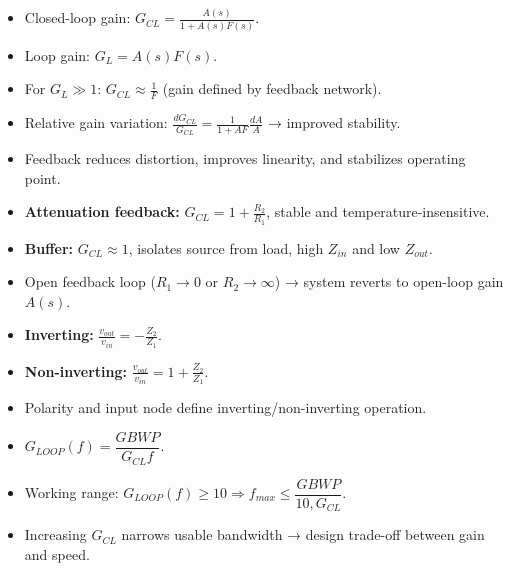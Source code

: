 \begin{tcolorbox}[colback=gray!10,colframe=black,title=Summary: Negative Feedback Principles]
\begin{itemize}
\item Closed-loop gain: $\displaystyle G_{CL} = \frac{A(s)}{1 + A(s)F(s)}$.
\item Loop gain: $G_L = A(s)F(s)$.
\item For $G_L \gg 1$: $G_{CL} \approx \frac{1}{F}$ (gain defined by feedback network).
\item Relative gain variation: $\displaystyle \frac{dG_{CL}}{G_{CL}} = \frac{1}{1+AF}\frac{dA}{A}$ → improved stability.
\item Feedback reduces distortion, improves linearity, and stabilizes operating point.
\end{itemize}
\end{tcolorbox}

\begin{tcolorbox}[colback=gray!10,colframe=black,title=Summary: Feedback Implementations & Buffers]
\begin{itemize}
\item \textbf{Attenuation feedback:} $\displaystyle G_{CL} = 1 + \frac{R_2}{R_1}$, stable and temperature-insensitive.
\item \textbf{Buffer:} $G_{CL} \approx 1$, isolates source from load, high $Z_{in}$ and low $Z_{out}$.
\item Open feedback loop ($R_1 \to 0$ or $R_2 \to \infty$) → system reverts to open-loop gain $A(s)$.
\end{itemize}
\end{tcolorbox}

\begin{tcolorbox}[colback=gray!10,colframe=black,title=Summary: Generalized OPAMP Configurations]
\begin{itemize}
\item \textbf{Inverting:} $\displaystyle \frac{v_{out}}{v_{in}} = -\frac{Z_2}{Z_1}$.
\item \textbf{Non-inverting:} $\displaystyle \frac{v_{out}}{v_{in}} = 1 + \frac{Z_2}{Z_1}$.
\item Polarity and input node define inverting/non-inverting operation.
\end{itemize}
\end{tcolorbox}

\begin{tcolorbox}[colback=gray!10,colframe=black,title=Summary: Frequency Response with Feedback]
\begin{itemize}
\item $G_{LOOP}(f) = \dfrac{GBWP}{G_{CL}f}$.
\item Working range: $G_{LOOP}(f) \ge 10 \Rightarrow f_{max} \le \dfrac{GBWP}{10,G_{CL}}$.
\item Increasing $G_{CL}$ narrows usable bandwidth → design trade-off between gain and speed.
\end{itemize}
\end{tcolorbox}

